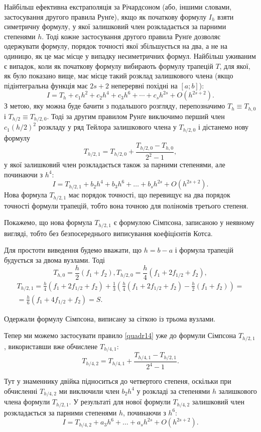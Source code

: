 \documentclass[14pt,twoside]{extreport}
\theoremstyle{mystyle}
\numberwithin{equation}{chapter}
\begin{document}
Найбільш ефективна екстраполяція за Річардсоном (або, іншими словами, застосування другого правила Рунґе), якщо як початкову формулу $I_h$ взяти симетричну формулу, у якої залишковий член розкладається за парними степенями $h$. Тоді кожне застосування другого правила Рунґе дозволяє одержувати формулу, порядок точності якої збільшується на два, а не на одиницю, як це має місце у випадку несиметричних формул. Найбільш уживаним є випадок, коли як початкову формулу вибирають формулу трапецій $T$, для якої, як було показано вище, має місце такий розклад залишкового члена (якщо підінтегральна функція має $2s+2$ неперервні похідні на $[a; b]$):
\[
 I=T_{h}+c_{1}h^{2}+c_{2}h^{4}+c_{3}h^{6}+\cdots+c_{s}h^{2s}+O\left(h^{2s+2}\right).
\]
З метою, яку можна буде бачити з подальшого розгляду, перепозначимо $T_h \equiv T_{h,0}$ і $T_{h/2} \equiv T_{h/2,0}$. Тоді за другим правилом Рунґе виключимо перший член $c_1(h/2)^2$ розкладу у ряд Тейлора залишкового члена у $T_{h/2,0}$ і дістанемо нову формулу
\[
 T_{h/2,1}=T_{h/2,0}+\frac{T_{h/2, 0} - T_{h, 0}}{2^{2}-1},
\]
у якої залишковий член розкладається також за парними степенями, але починаючи з $h^4$:
\[
I=T_{h/2,1}+b_{2}h^{4}+b_{3}h^{6}+\ldots+b_{s}h^{2s}+O\left(h^{2s+2}\right).
\]
Нова формула $T_{h/2,1}$ має порядок точності, що перевищує на два порядок точності формули трапецій, тобто вона точною для поліномів третього степеня.

Покажемо, що нова формула $T_{h/2,1}$ є формулою Сімпсона, записаною у неявному вигляді, тобто без безпосереднього виписування коефіцієнтів Котса.

Для простоти виведення будемо вважати, що $h = b - a$ і формула трапецій будується за двома вузлами. Тоді
\[
 T_{h,0} = \frac{h}{2}(f_{1}+f_{2}), T_{h/2,0} =\frac{h}{4}\left(f_{1}+2f_{1/2}+f_{2}\right),
\]
\begin{multline*}
 T_{h/2,1} = \frac{h}{4}(f_{1}+2f_{1/2}+f_{2})+\frac{1}{3}\left(\frac{h}{4}(f_{1}+2f_{1/2}+f_{2}) - \frac{h}{2}(f_{1}+f_{2})\right) =\\
 = \frac{h}{6}(f_{1}+4f_{1/2}+f_{2}) = S.
\end{multline*}

Одержали формулу Сімпсона, виписану за сіткою із трьома вузлами.

Тепер ми можемо застосувати правило \eqref{quadr14} уже до формули Сімпсона $T_{h/2,1}$, використавши вже обчислене $T_{h/4,1}$:
\[
 T_{h/4,2}=T_{h/4,1}+\frac{T_{h/4,1}-T_{h/2,1}}{2^{4}-1}.
\]

Тут у знаменнику двійка підноситься до четвертого степеня, оскільки при обчисленні $T_{h/4,2}$ ми виключили член $b_2h^4$ у розкладі за степенями $h$ залишкового члена формули $T_{h/2,1}$. У результаті для нової формули $T_{h/4,2}$ залишковий член розкладається за парними степенями $h$, починаючи з $h^6$:
\[
I=T_{h/4,2}+a_{3}h^{6} + \ldots + a_{s}h^{2s}+O\left(h^{2s+2}\right).
\]
\end{document}
